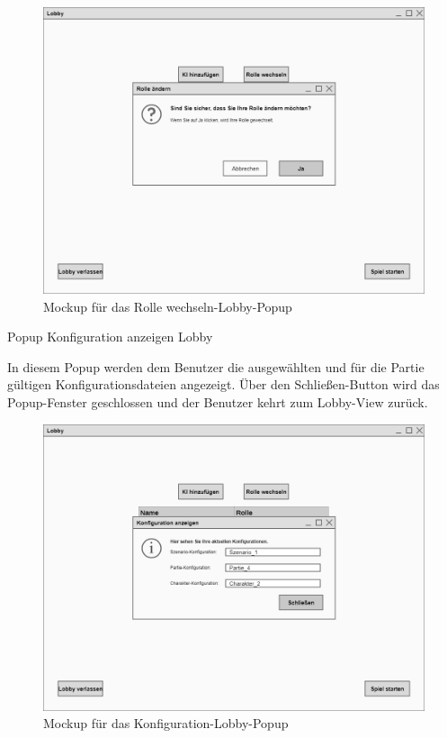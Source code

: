 \begin{figure}[H]
  \centering
  \includegraphics[width=\textwidth]{Meilenstein03/RolleWechseln-Lobby_Mockup.png}
  \caption{Mockup für das Rolle wechseln-Lobby-Popup}
\end{figure}

Popup \glqq{}Konfiguration anzeigen Lobby\grqq{}

In diesem Popup werden dem Benutzer die ausgewählten und für die Partie gültigen Konfigurationsdateien angezeigt. Über den Schließen-Button wird das Popup-Fenster geschlossen und der Benutzer kehrt zum Lobby-View zurück.

\begin{figure}[H]
  \centering
  \includegraphics[width=\textwidth]{Meilenstein03/Konfiguration-Lobby_Mockup.png}
  \caption{Mockup für das Konfiguration-Lobby-Popup}
\end{figure}

